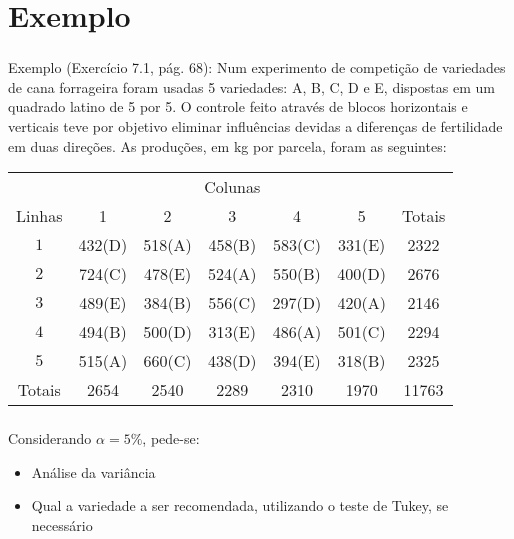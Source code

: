 \documentclass[14pt,aspectratio=1610]{beamer}
\begin{document}
\section{Exemplo}
\begin{frame}{}
\frametitle{}
\begin{block}{Exemplo (Exercício 7.1, pág. 68):}
\justifying
Num experimento de competição de variedades de cana forrageira foram usadas 5 variedades: A, B, C, D e E, dispostas em um 
quadrado latino de 5 por 5. O controle feito através de blocos horizontais e verticais teve por objetivo eliminar influências devidas a diferenças de fertilidade em duas direções. As produções, em kg por parcela, foram as seguintes:
\begin{table}[!h]
\begin{tabular}{ccccccc}
\hline
&\multicolumn{5}{c}{Colunas}\\
\cline{2-6}
Linhas&1&2&3&4&5&Totais\\
\hline
$1$&432(D)&518(A)&458(B)&583(C)&331(E)&2322\\
$2$&724(C)&478(E)&524(A)&550(B)&400(D)&2676\\
$3$&489(E)&384(B)&556(C)&297(D)&420(A)&2146\\
$4$&494(B)&500(D)&313(E)&486(A)&501(C)&2294\\
$5$&515(A)&660(C)&438(D)&394(E)&318(B)&2325\\
\hline
Totais&2654&2540&2289&2310&1970&11763\\
\hline
\end{tabular}
\end{table}
\end{block}
\end{frame}

\begin{frame}{}
\frametitle{}
\begin{block}{}
\justifying
Considerando $\alpha = 5\%$, pede-se:
\begin{itemize}
  \item Análise da variância
  \item Qual a variedade a ser recomendada, utilizando o teste de Tukey, se necessário
\end{itemize}
\end{block}
\end{frame}
\end{document}
